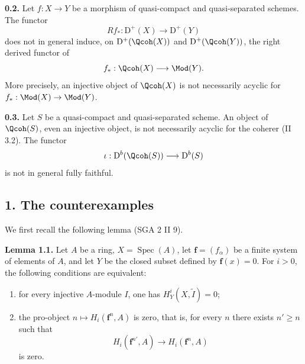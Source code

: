 \documentclass[11pt]{article}
\newcommand{\Spec}{\operatorname{Spec}}
\begin{document}
\textbf{0.2.} Let $f:X\to Y$ be a morphism of quasi-compact and quasi-separated schemes. The functor
\[
 Rf_*:\mathrm D^+(X)\longrightarrow\mathrm D^+(Y)
\]
does not in general induce, on $\mathrm D^+(\Qcoh(X))$ and $\mathrm D^+(\Qcoh(Y))$, the right derived functor of
\[
 f_*:\Qcoh(X)\longrightarrow\Mod(Y).
\]
More precisely, an injective object of $\Qcoh(X)$ is not necessarily acyclic for $f_*:\Mod(X)\to\Mod(Y)$.

\textbf{0.3.} Let $S$ be a quasi-compact and quasi-separated scheme. An object of $\Qcoh(S)$, even an injective object, is not necessarily acyclic for the coherer (II 3.2). The functor
\[
 \iota:\mathrm D^b(\Qcoh(S))\longrightarrow\mathrm D^b(S)
\]
is not in general fully faithful.

\subsection*{1. The counterexamples}
We first recall the following lemma (SGA 2 II 9).

\textbf{Lemma 1.1.} Let $A$ be a ring, $X=\Spec(A)$, let $\mathbf f=(f_\alpha)$ be a finite system of elements of $A$, and let $Y$ be the closed subset defined by $\mathbf f(x)=0$. For $i>0$, the following conditions are equivalent:
\begin{enumerate}[label=(\roman*)]
\item for every injective $A$-module $I$, one has $H^i_Y(X,\widetilde I)=0$;
\item the pro-object $n\mapsto H_i(\mathbf f^n,A)$ is zero, that is, for every $n$ there exists $n'\geq n$ such that
\[
 H_i(\mathbf f^{n'},A)\longrightarrow H_i(\mathbf f^n,A)
\]
is zero.
\end{enumerate}
\end{document}
